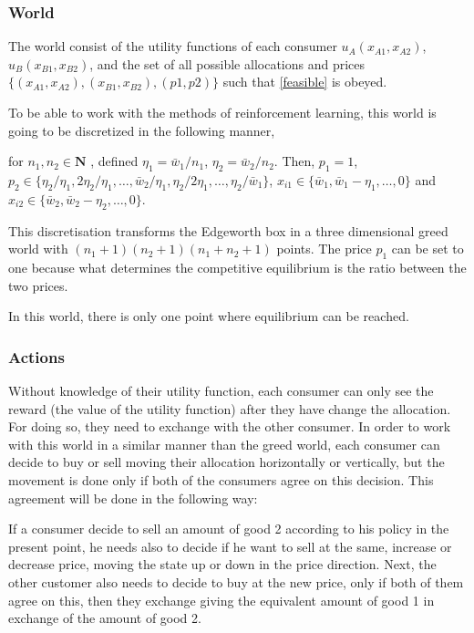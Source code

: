 \documentclass{article}
\begin{document}
\subsubsection*{World}
The world consist of the utility functions of each consumer $u_A(x_{A1},x_{A2})$,\\ $u_B(x_{B1},x_{B2})$, and the set of all possible allocations and prices \\$\{ (x_{A1},x_{A2}),(x_{B1},x_{B2}),(p1,p2) \}$ such that \cref{feasible} is obeyed. 

To be able to work with the methods of reinforcement learning, this world is going to be discretized in the following manner,

for $n_1,n_2 \in \mathbf{N}$ , defined $\eta_1 = \bar{w}_1/n_1$,  $\eta_2 = \bar{w}_2/n_2$. Then, $p_1 = 1$, $p_2 \in \{\eta_2/\eta_1,2\eta_2/\eta_1, \hdots , \bar{w}_2/\eta_1 , \eta_2/2\eta_1,\hdots,\eta_2/\bar{w}_1 \}$, $x_{i1} \in \{\bar{w}_1,\bar{w}_1 - \eta_1 ,\hdots,0 \}$ and $x_{i2} \in \{\bar{w}_2,\bar{w}_2 - \eta_2 ,\hdots,0 \}$.

This discretisation transforms the Edgeworth box in a three dimensional greed world with $(n_1+1)(n_2+1)(n_1+n_2 + 1)$ points. The price $p_1$ can be set to one because what determines the competitive equilibrium is the ratio between the two prices.

In this world, there is only one point where equilibrium can be reached. 

\subsubsection*{Actions}
Without knowledge of their utility function, each consumer can only see the reward (the value of the utility function) after they have change the allocation. For doing so, they need to exchange with the other consumer. In order to work with this world in a similar manner than the greed world, each consumer can decide to buy or sell moving their allocation horizontally or vertically, but the movement is done only if both of the consumers agree on this decision. This agreement will be done in the following way:

If a consumer decide to sell an amount of good 2 according to his policy in the present point, he needs also to decide if he want to sell at the same, increase or decrease price, moving the state up or down in the price direction. Next, the other customer also needs to decide to buy at the new price, only if both of them agree on this, then they exchange giving the equivalent amount of good 1 in exchange of the amount of good 2. 
\end{document}

